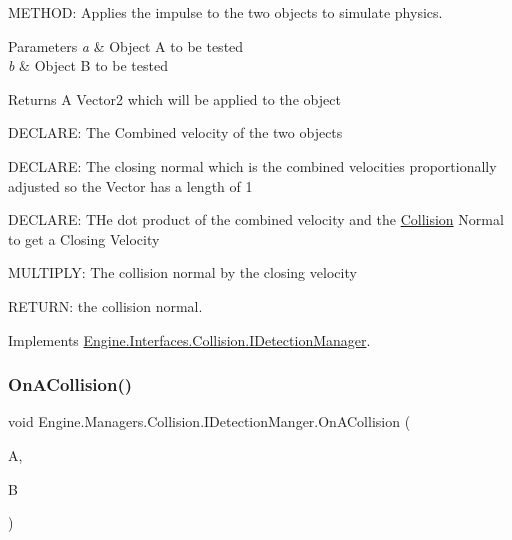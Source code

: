 M\+E\+T\+H\+OD\+: Applies the impulse to the two objects to simulate physics. 


\begin{DoxyParams}{Parameters}
{\em a} & Object A to be tested\\
\hline
{\em b} & Object B to be tested\\
\hline
\end{DoxyParams}
\begin{DoxyReturn}{Returns}
A Vector2 which will be applied to the object
\end{DoxyReturn}
D\+E\+C\+L\+A\+RE\+: The Combined velocity of the two objects

D\+E\+C\+L\+A\+RE\+: The closing normal which is the combined velocities proportionally adjusted so the Vector has a length of 1

D\+E\+C\+L\+A\+RE\+: T\+He dot product of the combined velocity and the \hyperlink{a00268}{Collision} Normal to get a Closing Velocity

M\+U\+L\+T\+I\+P\+LY\+: The collision normal by the closing velocity

R\+E\+T\+U\+RN\+: the collision normal. 

Implements \hyperlink{a00430_a853912077b127d7e6779accc914df3cf}{Engine.\+Interfaces.\+Collision.\+I\+Detection\+Manager}.

\mbox{\label{a00502_a31a209d98a58cac4f6abd47711bf545c}} 
\subsubsection{\texorpdfstring{On\+A\+Collision()}{OnACollision()}}
{\footnotesize\ttfamily void Engine.\+Managers.\+Collision.\+I\+Detection\+Manger.\+On\+A\+Collision (\begin{DoxyParamCaption}\item[{\hyperlink{a00426}{I\+Collidable}}]{A,  }\item[{\hyperlink{a00426}{I\+Collidable}}]{B }\end{DoxyParamCaption})\hspace{0.3cm}{\ttfamily [inline]}}



